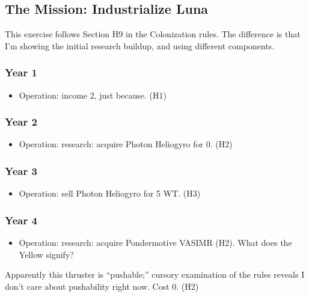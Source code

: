 \documentclass[]{article}
\date{}
\providecommand{\tightlist}{%
  \setlength{\itemsep}{0pt}\setlength{\parskip}{0pt}}
\begin{document}
\subsection{The Mission: Industrialize
Luna}\label{the-mission-industrialize-luna}

This exercise follows Section H9 in the Colonization rules. The
difference is that I'm showing the initial research buildup, and using
different components.

\subsubsection{Year 1}\label{year-1}

\begin{itemize}
\tightlist
\item
  Operation: income 2, just because. (H1)
\end{itemize}

\subsubsection{Year 2}\label{year-2}

\begin{itemize}
\tightlist
\item
  Operation: research: acquire Photon Heliogyro for 0. (H2)
\end{itemize}

\subsubsection{Year 3}\label{year-3}

\begin{itemize}
\tightlist
\item
  Operation: sell Photon Heliogyro for 5 WT. (H3)
\end{itemize}

\subsubsection{Year 4}\label{year-4}

\begin{itemize}
\tightlist
\item
  Operation: research: acquire Pondermotive VASIMR (H2). What does the
  Yellow signify?
\end{itemize}

Apparently this thruster is ``pushable;'' cursory examination of the
rules reveals I don't care about pushability right now. Cost 0. (H2)
\end{document}
